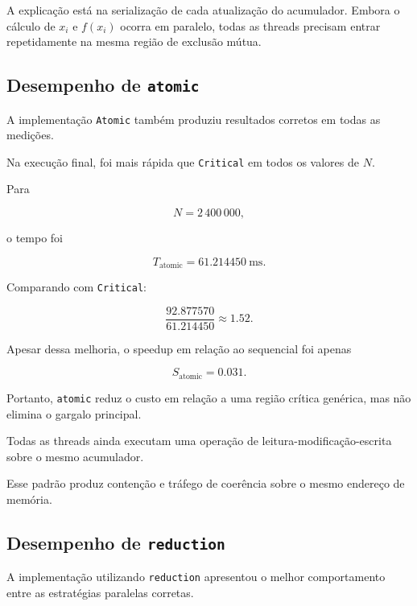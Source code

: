 A explicação está na serialização de cada atualização do acumulador. Embora
o cálculo de \(x_i\) e \(f(x_i)\) ocorra em paralelo, todas as threads
precisam entrar repetidamente na mesma região de exclusão mútua.


\subsection{Desempenho de \texttt{atomic}}

A implementação \texttt{Atomic} também produziu resultados corretos em
todas as medições.

Na execução final, foi mais rápida que \texttt{Critical} em todos os valores
de \(N\).

Para

\begin{equation}
    N=2\,400\,000,
\end{equation}

o tempo foi

\begin{equation}
    T_{\text{atomic}}
    =
    61.214450\ \text{ms}.
\end{equation}

Comparando com \texttt{Critical}:

\begin{equation}
    \frac{92.877570}{61.214450}
    \approx
    1.52.
\end{equation}

Apesar dessa melhoria, o speedup em relação ao sequencial foi apenas

\begin{equation}
    S_{\text{atomic}}
    =
    0.031.
\end{equation}

Portanto, \texttt{atomic} reduz o custo em relação a uma região crítica
genérica, mas não elimina o gargalo principal.

Todas as threads ainda executam uma operação de leitura-modificação-escrita
sobre o mesmo acumulador.

Esse padrão produz contenção e tráfego de coerência sobre o mesmo endereço
de memória.


\subsection{Desempenho de \texttt{reduction}}

A implementação utilizando \texttt{reduction} apresentou o melhor
comportamento entre as estratégias paralelas corretas.

